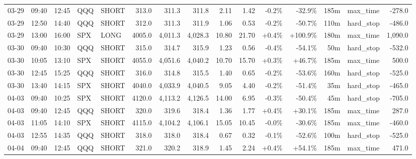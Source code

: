 \documentclass[11pt,a4paper,twoside]{article}
\begin{document}
\begin{landscape}
\begin{center}
\begin{longtable}{>{\color{txtmain}}l l l l l r r r r r r r r >{\color{txtmain}}l r}
03-29 & 09:40 & 12:45 & QQQ & SHORT & 313.0 & 311.3 & 311.8 & 2.11 & 1.42 & \textcolor{lossred}{-0.2\%} & \textcolor{lossred}{-32.9\%} & 185m & max\_time & \textcolor{lossred}{-278.0} \\
03-29 & 12:50 & 14:40 & QQQ & SHORT & 312.0 & 311.3 & 311.9 & 1.06 & 0.53 & \textcolor{lossred}{-0.2\%} & \textcolor{lossred}{-50.7\%} & 110m & hard\_stop & \textcolor{lossred}{-486.0} \\
03-29 & 13:00 & 16:00 & SPX & LONG & 4005.0 & 4,011.3 & 4,028.3 & 10.80 & 21.70 & \textcolor{wingreen}{+0.4\%} & \textcolor{wingreen}{+100.9\%} & 180m & max\_time & \textcolor{wingreen}{1,090.0} \\
03-30 & 09:40 & 10:30 & QQQ & SHORT & 315.0 & 314.7 & 315.9 & 1.23 & 0.56 & \textcolor{lossred}{-0.4\%} & \textcolor{lossred}{-54.1\%} & 50m & hard\_stop & \textcolor{lossred}{-532.0} \\
03-30 & 10:05 & 13:10 & SPX & SHORT & 4055.0 & 4,051.6 & 4,040.2 & 10.70 & 15.70 & \textcolor{wingreen}{+0.3\%} & \textcolor{wingreen}{+46.7\%} & 185m & max\_time & \textcolor{wingreen}{500.0} \\
03-30 & 12:45 & 15:25 & QQQ & SHORT & 316.0 & 314.8 & 315.5 & 1.40 & 0.65 & \textcolor{lossred}{-0.2\%} & \textcolor{lossred}{-53.6\%} & 160m & hard\_stop & \textcolor{lossred}{-525.0} \\
03-30 & 13:40 & 14:15 & SPX & SHORT & 4040.0 & 4,033.9 & 4,040.5 & 9.05 & 4.40 & \textcolor{lossred}{-0.2\%} & \textcolor{lossred}{-51.4\%} & 35m & hard\_stop & \textcolor{lossred}{-465.0} \\
04-03 & 09:40 & 10:25 & SPX & SHORT & 4120.0 & 4,113.2 & 4,126.5 & 14.00 & 6.95 & \textcolor{lossred}{-0.3\%} & \textcolor{lossred}{-50.4\%} & 45m & hard\_stop & \textcolor{lossred}{-705.0} \\
04-03 & 09:40 & 12:45 & QQQ & SHORT & 320.0 & 319.6 & 318.4 & 1.36 & 1.77 & \textcolor{wingreen}{+0.4\%} & \textcolor{wingreen}{+30.1\%} & 185m & max\_time & \textcolor{wingreen}{287.0} \\
04-03 & 11:05 & 14:10 & SPX & SHORT & 4115.0 & 4,104.2 & 4,106.1 & 15.05 & 10.45 & \textcolor{lossred}{-0.0\%} & \textcolor{lossred}{-30.6\%} & 185m & max\_time & \textcolor{lossred}{-460.0} \\
04-03 & 12:55 & 14:35 & QQQ & SHORT & 318.0 & 318.0 & 318.4 & 0.67 & 0.32 & \textcolor{lossred}{-0.1\%} & \textcolor{lossred}{-52.6\%} & 100m & hard\_stop & \textcolor{lossred}{-525.0} \\
04-04 & 09:40 & 12:45 & QQQ & SHORT & 321.0 & 320.2 & 318.9 & 1.45 & 2.24 & \textcolor{wingreen}{+0.4\%} & \textcolor{wingreen}{+54.1\%} & 185m & max\_time & \textcolor{wingreen}{471.0} \\

\end{longtable}
\end{center}
\end{landscape}
\end{document}

